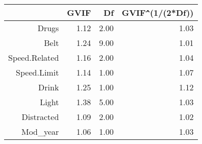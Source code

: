 \begin{table}[ht]
\centering
\begin{tabular}{rrrr}
  \hline
 & GVIF & Df & GVIF\verb|^|(1/(2*Df)) \\ 
  \hline
Drugs & 1.12 & 2.00 & 1.03 \\ 
  Belt & 1.24 & 9.00 & 1.01 \\ 
  Speed.Related & 1.16 & 2.00 & 1.04 \\ 
  Speed.Limit & 1.14 & 1.00 & 1.07 \\ 
  Drink & 1.25 & 1.00 & 1.12 \\ 
  Light & 1.38 & 5.00 & 1.03 \\ 
  Distracted & 1.09 & 2.00 & 1.02 \\ 
  Mod\_year & 1.06 & 1.00 & 1.03 \\ 
   \hline
\end{tabular}
\end{table}
